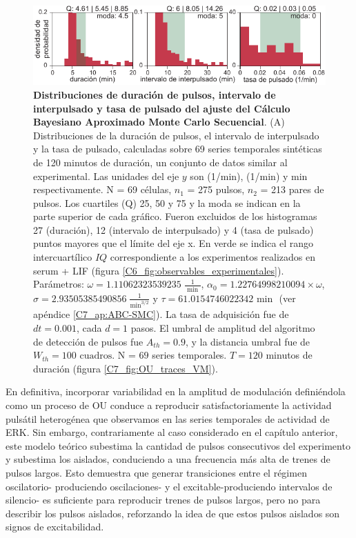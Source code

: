 \documentclass[./main.tex]{subfiles}
\begin{document}
\begin{figure}
    \centering
    \includegraphics[width=1\columnwidth]{figures/chapter7/C7_OU_validation_hist.pdf} 
    \caption{\textbf{Distribuciones de duración de pulsos, intervalo de interpulsado y tasa de pulsado del ajuste del Cálculo Bayesiano Aproximado Monte Carlo Secuencial}. (A) Distribuciones de la duración de pulsos, el intervalo de interpulsado y la tasa de pulsado, calculadas sobre 69 series temporales sintéticas de 120 minutos de duración, un conjunto de datos similar al experimental. Las unidades del eje $y$ son (1/min), (1/min) y min respectivamente. N = 69 células, $n_1$ = 275 pulsos, $n_2$ = 213 pares de pulsos. Los cuartiles (Q) 25, 50 y 75 y la moda se indican en la parte superior de cada gráfico. Fueron excluidos de los histogramas 27 (duración), 12 (intervalo de interpulsado) y 4 (tasa de pulsado) puntos mayores que el límite del eje x. En verde se indica el rango intercuartílico $IQ$ correspondiente a los experimentos realizados en serum + LIF (figura \ref{C6_fig:observables_experimentales}). Parámetros: $\omega = 1.11062323539235 \; \frac{1}{\text{ min }}$, $\alpha_0 = 1.22764998210094 \times \omega$, $ \sigma = 2.93505385490856 \; \frac{1}{\text{min}^{3/2}}$ y $\tau = 61.0154746022342 \text{ min } $ (ver apéndice \ref{C7_ap:ABC-SMC}). La tasa de adquisición fue de $dt = 0.001$, cada $d = 1$ pasos. El umbral de amplitud del algoritmo de detección de pulsos fue $A_{th} = 0.9$, y la distancia umbral fue de $W_{th} = 100\text{ cuadros}$. N = $69$ series temporales. $T = 120$ minutos de duración (figura \ref{C7_fig:OU_traces_VM}).}
    \label{C7_fig:OU_param_evaluation_hist}
\end{figure} 


En definitiva, incorporar variabilidad en la amplitud de modulación definiéndola como un proceso de OU conduce a reproducir satisfactoriamente la actividad pulsátil heterogénea que observamos en las series temporales de actividad de ERK. Sin embargo, contrariamente al caso considerado en el capítulo anterior, este modelo teórico subestima la cantidad de pulsos consecutivos del experimento y subestima los aislados, conduciendo a una frecuencia más alta de trenes de pulsos largos. Esto demuestra que generar transiciones entre el régimen oscilatorio- produciendo oscilaciones- y el excitable-produciendo intervalos de silencio- es suficiente para reproducir trenes de pulsos largos, pero no para describir los pulsos aislados, reforzando la idea de que estos pulsos aislados son signos de excitabilidad. 
\end{document}
